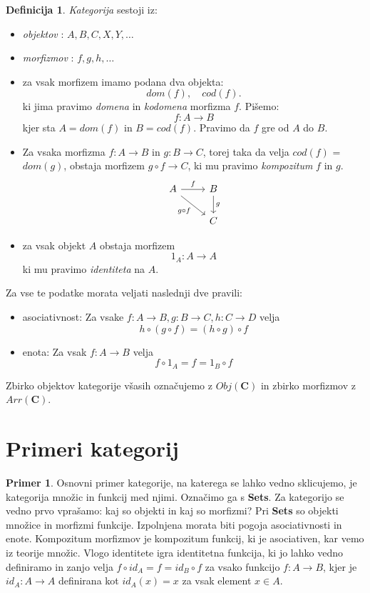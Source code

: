 \documentclass[12pt,a4paper]{book}
\theoremstyle{definition}
\newtheorem{definicija}{Definicija}[chapter]
\theoremstyle{plain}
\theoremstyle{definition}
\newtheorem{primer}{Primer}[section]
\theoremstyle{remark}
\newcommand{\cat}[1]{\textbf{#1}}
\begin{document}
\begin{definicija}
\emph{Kategorija} sestoji iz:
\begin{itemize}
\item \emph{objektov} : $A,B,C,X,Y,\ldots$
\item \emph{morfizmov} : $f,g,h,\ldots$
\item za vsak morfizem imamo podana dva objekta: $$dom(f), \quad cod(f).$$
ki jima pravimo \emph{domena} in \emph{kodomena} morfizma $f$. Pišemo:
$$f\colon A \to B$$
kjer sta $A = dom(f)$ in $B = cod(f)$.
Pravimo da $f$ gre od $A$ do $B$.
\item Za vsaka morfizma $f \colon A \to B$ in $g \colon B \to C$, torej taka da velja $cod(f)$ = $dom(g)$, obstaja morfizem $g\circ f \to C$, ki mu pravimo \emph{kompozitum} $f$ in $g$.
%
\[
\begin{tikzcd}
A \arrow[r, "f"] \arrow[rd, "g \circ f"']  & B  \arrow[d, "g"] \\
				& C
\end{tikzcd}
\] 
%
\item za vsak objekt $A$ obstaja morfizem
$$1_A : A \to A$$
ki mu pravimo \emph{identiteta} na $A$.		
\end{itemize}
Za vse te podatke morata veljati naslednji dve pravili:
\begin{itemize}
\item asociativnost: Za vsake $f : A \to B, g : B \to C, h : C \to D$ velja
$$h \circ (g \circ f) = (h \circ g) \circ f$$
\item enota: Za vsak $f : A \to B$ velja
$$f \circ 1_A = f = 1_B \circ f$$
\end{itemize}
\end{definicija}
%
Zbirko objektov kategorije všasih označujemo z $Obj(\cat{C})$ in zbirko morfizmov z $Arr(\cat{C})$.

\section{Primeri kategorij}

\begin{primer}
Osnovni primer kategorije, na katerega se lahko vedno sklicujemo, je kategorija množic in funkcij med njimi. Označimo ga s \cat{Sets}. Za kategorijo se vedno prvo vprašamo: kaj so objekti in kaj so morfizmi? Pri \textbf{Sets} so objekti množice in morfizmi funkcije.
Izpolnjena morata biti pogoja asociativnosti in enote.
Kompozitum morfizmov je kompozitum funkcij, ki je asociativen, kar vemo iz teorije množic.
Vlogo identitete igra identitetna funkcija, ki jo lahko vedno definiramo in zanjo velja $f \circ id_A = f = id_B \circ f$ za vsako funkcijo $f : A \to B$, kjer je $id_A : A \to A$ definirana kot $id_A(x) = x$ za vsak element $x \in A$.
\end{primer}
\end{document}
